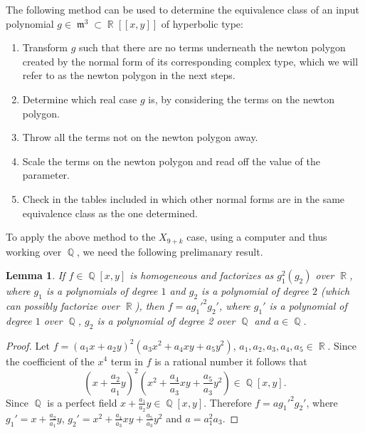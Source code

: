 \documentclass[noend]{amsproc}
\newtheorem{lemma}[theorem]{Lemma}
\theoremstyle{definition}
\DeclareMathOperator{\m}{\mathfrak{m}}
\DeclareMathOperator{\Q}{\mathbb{Q}}
\DeclareMathOperator{\R}{\mathbb{R}}
\begin{document}
The following method can be used to determine the equivalence class of an input polynomial $g\in\m^3\subset\R[[x,y]]$ of hyperbolic type:

\begin{enumerate}
\item Transform $g$ such that there are no terms underneath the newton polygon created by the normal form of its corresponding complex type, which we will refer to as the newton polygon in the next steps.
\item Determine which real case $g$ is, by considering the terms on the newton polygon.
\item Throw all the terms not on the newton polygon away.
\item Scale the terms on the newton polygon and read off the value of the parameter.
\item Check in the tables included in \cite{realclassify2} which other normal forms are in the same equivalence class as the one determined.
\end{enumerate}

To apply the above method to the $X_{9+k}$ case, using a computer and thus working over $\Q$, we need the following prelimanary result.

\begin{lemma}\label{J10+kfactorization}
If $f\in\Q[x,y]$ is homogeneous and factorizes as $g_1^2(g_2)$ over $\R$, where $g_1$ is a polynomials of degree $1$ and $g_2$ is a polynomial of degree $2$ (which can possibly factorize over $\R$), then $f=ag_1'^2g_2'$, where $g_1'$ is a polynomial of degree $1$ over $\Q$, $g_2$ is a polynomial of degree 2 over $\Q$ and $a\in\Q$.
\end{lemma}

\begin{proof}
Let $f=(a_1x+a_2y)^2(a_3x^2+a_4xy+a_5y^2)$, $a_1,a_2,a_3,a_4,a_5\in\R$. Since the coefficient of the $x^4$ term in $f$ is a rational number it follows that 
\[(x+\frac{a_2}{a_1}y)^2(x^2+\frac{a_4}{a_3}xy+\frac{a_5}{a_3}y^2)\in\Q[x,y].\]
Since $\Q$ is a perfect field
$x+\frac{a_1}{a_2}y\in\Q[x,y]$. Therefore $f=ag_1'^2g_2'$, where
$g_1'=x+\frac{a_2}{a_1}y$, $g_2'=x^2+\frac{a_4}{a_3}xy+\frac{a_5}{a_3}y^2$ and $a=a_1^2a_3$.
\end{proof}
\end{document}
